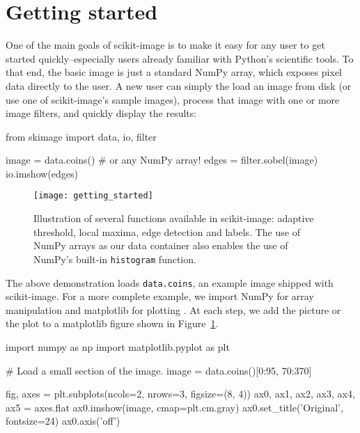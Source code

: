 
\section*{Getting started}
  \label{sec:getting-started}

  One of the main goals of scikit-image is to make it easy for any user to get started quickly--especially users already familiar with Python's scientific tools. To that end, the basic image is just a standard NumPy array, which exposes pixel data directly to the user. A new user can simply the load an image from disk (or use one of scikit-image's sample images), process that image with one or more image filters, and quickly display the results:

  \begin{pyverbatim}
    from skimage import data, io, filter

    image = data.coins()  # or any NumPy array!
    edges = filter.sobel(image)
    io.imshow(edges)
  \end{pyverbatim}

  \begin{figure}
    \texttt{[image: getting\_started]}

    \caption[Getting started figure]{\label{fig:gettingstarted}Illustration of several functions available in scikit-image: adaptive threshold, local maxima, edge detection and labels. The use of NumPy arrays as our data container also enables the use of NumPy's built-in \texttt{histogram} function.}
  \end{figure}

  The above demonstration loads \texttt{data.coins}, an example image shipped with scikit-image.  For a more complete example, we import NumPy for array manipulation and matplotlib for plotting \citep{numpy,matplotlib}.  At each step, we add the picture or the plot to a matplotlib figure shown in Figure~\ref{fig:gettingstarted}.

  \begin{pyverbatim}
    import numpy as np
    import matplotlib.pyplot as plt

    # Load a small section of the image.
    image = data.coins()[0:95, 70:370]

    fig, axes = plt.subplots(ncols=2, nrows=3,
                             figsize=(8, 4))
    ax0, ax1, ax2, ax3, ax4, ax5  = axes.flat
    ax0.imshow(image, cmap=plt.cm.gray)
    ax0.set_title('Original', fontsize=24)
    ax0.axis('off')
  \end{pyverbatim}

